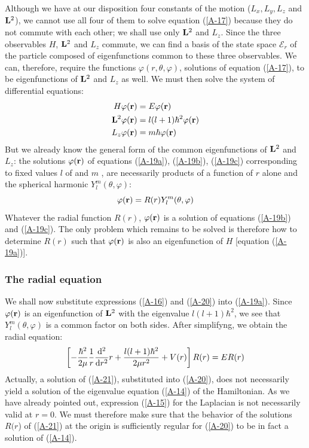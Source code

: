 Although we have at our disposition four constants of the motion ($L_x,L_y,L_z$ and $\vb{L}^2$), we cannot use all four of them to solve equation (\ref{A-17}) because they do not commute with each other; we shall use only $\vb{L}^2$ and $L_z$. Since the three observables $H$, $\vb{L}^2$ and $L_z$ commute, we can find a basis of the state space $\mathcal{E}_r$ of the particle composed of eigenfunctions common to these three observables. We can, therefore,  require the functions $\varphi(r,\theta,\varphi)$, solutions of equation (\ref{A-17}), to be eigenfunctions of $\vb{L}^2$ and $L_z$  as well. We must then solve the system of differential equations:
\begin{align}
	\label{A-19a}H\varphi(\vb{r})&=E\varphi(\vb{r})\\
	\label{A-19b}\vb{L}^2\varphi(\vb{r})&=l(l+1)\hbar^2\varphi(\vb{r})\\
	L_z\varphi(\vb{r})&=m\hbar \varphi(\vb{r}) \label{A-19c}
\end{align}
But we already know the general form of the common eigenfunctions of $\vb{L}^2$ and $L_z$: the solutions $\varphi(\vb{r})$ of equations (\ref{A-19a}), (\ref{A-19b}), (\ref{A-19c}) corresponding to fixed values $l$ of and $m$ , are necessarily products of a function of $r$ alone and the spherical harmonic $Y_l^m(\theta,\varphi)$:
\begin{equation}\label{A-20}
	\varphi(\vb{r})=R(r)Y_l^m(\theta,\varphi)
\end{equation}
Whatever the radial function $R(r)$, $\varphi(\vb{r})$ is a solution of equations (\ref{A-19b}) and (\ref{A-19c}). The only problem which remains to be solved is therefore how to determine $R(r)$ such that $\varphi(\vb{r})$ is also an eigenfunction of $H$ [equation (\ref{A-19a})].

\subsubsection{The radial equation}
We shall now substitute expressions (\ref{A-16}) and (\ref{A-20}) into (\ref{A-19a}). Since $\varphi(\vb{r})$ is an eigenfunction of $\vb{L}^2$ with the eigenvalue $l(l+1)\hbar^2$, we see that $Y_l^m(\theta,\varphi)$ is a common factor on both sides. After simplifyng, we obtain the radial equation:
\begin{equation}\label{A-21}
	\left[-\frac{\hbar^2}{2\mu}\frac{1}{r}\dv[2]{r}r+\frac{l(l+1)\hbar^2}{2\mu r^2}+V(r)\right]R(r)=ER(r)
\end{equation}
Actually, a solution of (\ref{A-21}), substituted into (\ref{A-20}), does not necessarily yield a solution of the eigenvalue equation (\ref{A-14}) of the Hamiltonian. As we have already pointed out, expression (\ref{A-15}) for the Laplacian is not necessarily valid at $r=0$. We must therefore make sure that the behavior of the solutions $R(r$) of (\ref{A-21}) at the origin is sufficiently regular for (\ref{A-20}) to be in fact a solution of (\ref{A-14}).

